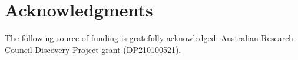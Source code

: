 \section*{Acknowledgments}

The following source of funding is gratefully acknowledged: Australian Research Council Discovery Project grant (DP210100521).









\address{John T. Ormerod\\
  School of Mathematics and Statistics, University of Sydney\\
  Sydney\\
  Australia\\}

\address{Mohammad Javad Davoudabadi\\
  School of Mathematics and Statistics, University of Sydney\\
  Sydney\\
  Australia\\}

\address{Garth Tarr\\
  School of Mathematics and Statistics, University of Sydney\\
  Sydney\\
  Australia\\}

\address{Samuel Muller\\
   Faculty of Science and Engineering, Macquarie University\\
  Sydney\\
  Australia\\}

\address{Jonathon Tidswell\\
  School of Mathematics and Statistics, University of Sydney\\
  Sydney\\
  Australia\\}

